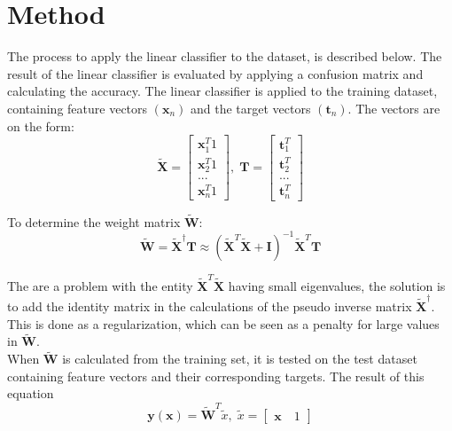 \section{Method}
The process to apply the linear classifier to the dataset, is described below. 
The result of the linear classifier is evaluated by applying a confusion matrix and calculating the accuracy. 
The linear classifier is applied to the training dataset, containing feature vectors $(\mathbf{x}_n)$ and the target vectors $(\mathbf{t}_n)$.
The vectors are on the form:
\begin{equation}
\mathbf{\tilde{X}}=\left[ \begin{array}{c}\mathbf{x}_1^T 1\\
\mathbf{x}_2^T 1\\
...\\ 
\mathbf{x}_n^T 1 \end{array} \right],
\;
\mathbf{T}=\left[ \begin{array}{c}
\mathbf{t}_1^T\\ 
\mathbf{t}_2^T\\ 
...\\
\mathbf{t}_n^T
\end{array} \right]
\label{eq:linearVectors}  
\end{equation} 

To determine the weight matrix $\tilde{\mathbf{W}}$:
\begin{equation}
\tilde{\mathbf{W}} = \tilde{\mathbf{X}}^\dagger \mathbf{T} \approx  (\tilde{\mathbf{X}}^T \tilde{\mathbf{X}}+\mathbf{I})^{-1} \tilde{\mathbf{X}}^T\mathbf{T}
\label{eq:weightVector}  
\end{equation}

The are a problem with the entity $\tilde{\mathbf{X}}^T \tilde{\mathbf{X}}$ having small eigenvalues, the solution is to add the identity matrix in the calculations of the pseudo inverse matrix $\tilde{\mathbf{X}}^\dagger$.
This is done as a regularization, which can be seen as a penalty for large values in $\tilde{\mathbf{W}}$.\\

When $\tilde{\mathbf{W}}$ is calculated from the training set, it is tested on the test dataset containing feature vectors and their corresponding targets. 
The result of this equation
\begin{equation}
\mathbf{y}(\mathbf{x}) = \tilde{\mathbf{W}}^{T} \tilde{x},
\;
\tilde{x} = \left[\begin{array}{c}
\mathbf{x}\quad 1
\end{array} \right] 
\label{eq:Yclassifier}
\end{equation}

